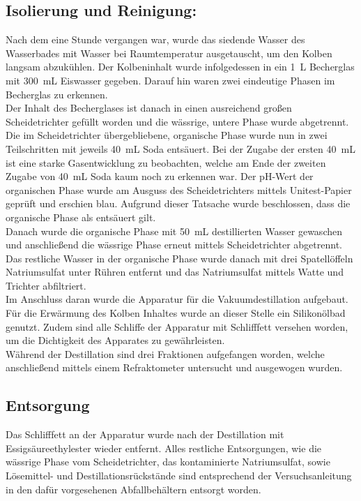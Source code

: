 \subsection*{Isolierung und Reinigung:}
Nach dem eine Stunde vergangen war, wurde das siedende Wasser des Wasserbades mit Wasser bei Raumtemperatur ausgetauscht, um den Kolben langsam abzukühlen. Der Kolbeninhalt wurde infolgedessen in ein \SI{1}{\liter} Becherglas mit \SI{300}{\milli \liter} Eiswasser gegeben. Darauf hin waren zwei eindeutige Phasen im Becherglas zu erkennen.\\
Der Inhalt des Becherglases ist danach in einen ausreichend großen Scheidetrichter gefüllt worden und die wässrige, untere Phase wurde abgetrennt. Die im Scheidetrichter übergebliebene, organische Phase wurde nun in zwei Teilschritten mit jeweils \SI{40}{\milli \liter} Soda entsäuert. Bei der Zugabe der ersten \SI{40}{\milli \liter} ist eine starke Gasentwicklung zu beobachten, welche am Ende der zweiten Zugabe von \SI{40}{\milli \liter} Soda kaum noch zu erkennen war. Der pH-Wert der organischen Phase wurde am Ausguss des Scheidetrichters mittels Unitest-Papier geprüft und erschien blau. Aufgrund dieser Tatsache wurde beschlossen, dass die organische Phase als entsäuert gilt.\\
Danach wurde die organische Phase mit \SI{50}{\milli \liter} destillierten Wasser gewaschen und anschließend die wässrige Phase erneut mittels Scheidetrichter abgetrennt. Das restliche Wasser in der organische Phase wurde danach mit drei Spatellöffeln Natriumsulfat unter Rühren entfernt und das Natriumsulfat mittels Watte und Trichter abfiltriert.\\
Im Anschluss daran wurde die Apparatur für die Vakuumdestillation aufgebaut. Für die Erwärmung des Kolben Inhaltes wurde an dieser Stelle ein Silikonölbad genutzt. Zudem sind alle Schliffe der Apparatur mit Schlifffett versehen worden, um die Dichtigkeit des Apparates zu gewährleisten. \\
Während der Destillation sind drei Fraktionen aufgefangen worden, welche anschließend mittels einem Refraktometer untersucht und ausgewogen wurden.

\subsection*{Entsorgung}
Das Schlifffett an der Apparatur wurde nach der Destillation mit Essigsäureethylester wieder entfernt. Alles restliche Entsorgungen, wie die wässrige Phase vom Scheidetrichter, das kontaminierte Natriumsulfat, sowie Lösemittel- und Destillationsrückstände sind entsprechend der Versuchsanleitung in den dafür vorgesehenen Abfallbehältern entsorgt worden.